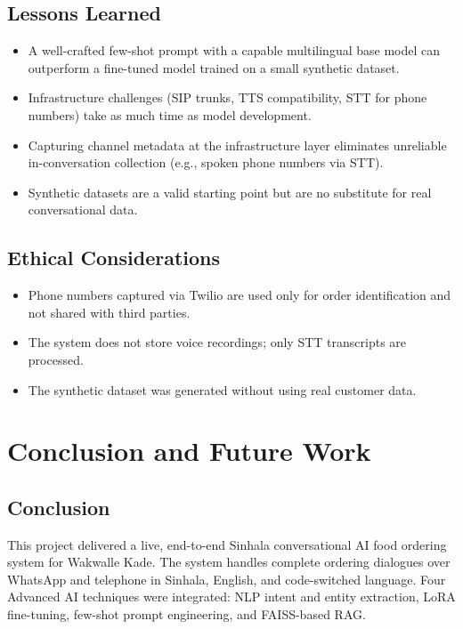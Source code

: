 \documentclass[12pt,a4paper]{report}
\begin{document}
\section{Lessons Learned}
\begin{itemize}
    \item A well-crafted few-shot prompt with a capable multilingual base model can outperform a fine-tuned model trained on a small synthetic dataset.
    \item Infrastructure challenges (SIP trunks, TTS compatibility, STT for phone numbers) take as much time as model development.
    \item Capturing channel metadata at the infrastructure layer eliminates unreliable in-conversation collection (e.g., spoken phone numbers via STT).
    \item Synthetic datasets are a valid starting point but are no substitute for real conversational data.
\end{itemize}

\section{Ethical Considerations}
\begin{itemize}
    \item Phone numbers captured via Twilio are used only for order identification and not shared with third parties.
    \item The system does not store voice recordings; only STT transcripts are processed.
    \item The synthetic dataset was generated without using real customer data.
\end{itemize}

\chapter{Conclusion and Future Work}

\section{Conclusion}
This project delivered a live, end-to-end Sinhala conversational AI food ordering system for Wakwalle Kade. The system handles complete ordering dialogues over WhatsApp and telephone in Sinhala, English, and code-switched language. Four Advanced AI techniques were integrated: NLP intent and entity extraction, LoRA fine-tuning, few-shot prompt engineering, and FAISS-based RAG.
\end{document}
